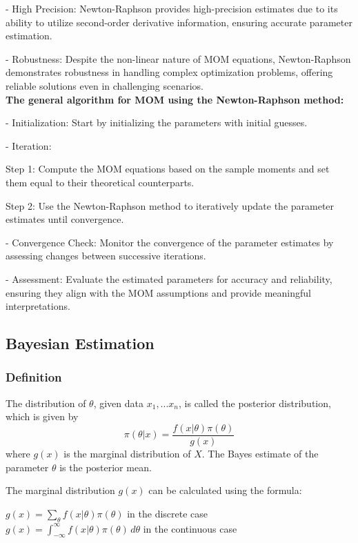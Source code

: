 \documentclass[12pt]{article}
\begin{document}
		- High Precision: Newton-Raphson provides high-precision estimates due to its ability to utilize second-order derivative information, ensuring accurate parameter estimation.
		
		- Robustness: Despite the non-linear nature of MOM equations, Newton-Raphson demonstrates robustness in handling complex optimization problems, offering reliable solutions even in challenging scenarios.
		\\
		
		\textbf{The general algorithm for MOM using the Newton-Raphson method:}
		
		- Initialization: Start by initializing the parameters with initial guesses.
		
		- Iteration: 
		
		Step 1: Compute the MOM equations based on the sample moments and set them equal to their theoretical counterparts.
		
		Step 2: Use the Newton-Raphson method to iteratively update the parameter estimates until convergence.
		
		- Convergence Check: Monitor the convergence of the parameter estimates by assessing changes between successive iterations.
		
		- Assessment: Evaluate the estimated parameters for accuracy and reliability, ensuring they align with the MOM assumptions and provide meaningful interpretations.
			
		\subsection{Bayesian Estimation}
		\subsubsection{Definition}
		The distribution of $\theta$, given data $x_{1},...x_{n}$, is called the posterior distribution, which is given by
		$$\pi(\theta|x) = \frac{f(x|\theta)\pi(\theta)}{g(x)}$$
		where $g(x)$ is the marginal distribution of $X$. The Bayes estimate of the parameter $\theta$ is the posterior mean. 
		
		The marginal distribution $g(x)$ can be calculated using the formula:
			
		\begin{center}
			$g(x) = \sum_{\theta} f(x|\theta)\pi(\theta)$ in the discrete case\\
		$g(x) = \int_{-\infty}^{\infty} f(x|\theta)\pi(\theta) \, d\theta$  in the continuous case
		\end{center}
		
\end{document}
